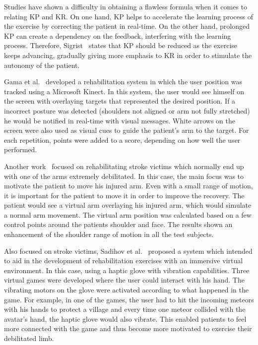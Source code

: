 Studies have shown a difficulty in obtaining a flawless formula when it comes to relating \ac{KP} and \ac{KR}. 
On one hand, \ac{KP} helps to accelerate the learning process of the exercise by correcting the patient in
real-time. On the other hand, prolonged \ac{KP} can create a dependency on the feedback, interfering with the 
learning process. Therefore, Sigrist~\cite{Sigrist2013} states that \ac{KP} should be reduced as the exercise
keeps advancing, gradually giving more emphasis to \ac{KR} in order to stimulate the autonomy of the patient.

Gama et al.~\cite{Gama2012a} developed a rehabilitation system in which the user position was tracked using a 
Microsoft Kinect. In this system, the user would see himself on the screen with overlaying targets that represented the desired position. 
If a incorrect posture was detected (shoulders not aligned or arm not fully stretched) he would be notified in real-time with visual messages. 
White arrows on the screen were also used as visual cues to guide the patient's arm to the target.
For each repetition, points were added to a score, depending on how well the user performed.


Another work~\cite{Klein2013} focused on rehabilitating stroke victims which normally end up with one of the arms extremely debilitated.
In this case, the main focus was to motivate the patient to move his injured arm. Even with a small range of motion, it is 
important for the patient to move it in order to improve the recovery. The patient would see a virtual arm overlaying his injured arm, which would simulate a normal arm movement. 
The virtual arm position was calculated based on a few control points around the patients shoulder and face. 
The results shown an enhancement of the shoulder range of motion in all the test subjects.

Also focused on stroke victims, Sadihov et al.~\cite{Sadihov2013} proposed a system which intended to aid in the development of 
rehabilitation exercises with an immersive virtual environment. In this case, using a haptic glove with vibration capabilities.  
Three virtual games were developed where the user could interact with his hand. The vibrating motors on the glove 
were activated according to what happened in the game. For example, in one of the games, the user had to hit 
the incoming meteors with his hands to protect a village and every time one meteor collided with the avatar's hand,
the haptic glove would also vibrate. This enabled patients to feel more connected with the game and thus become more motivated to exercise their debilitated limb.

